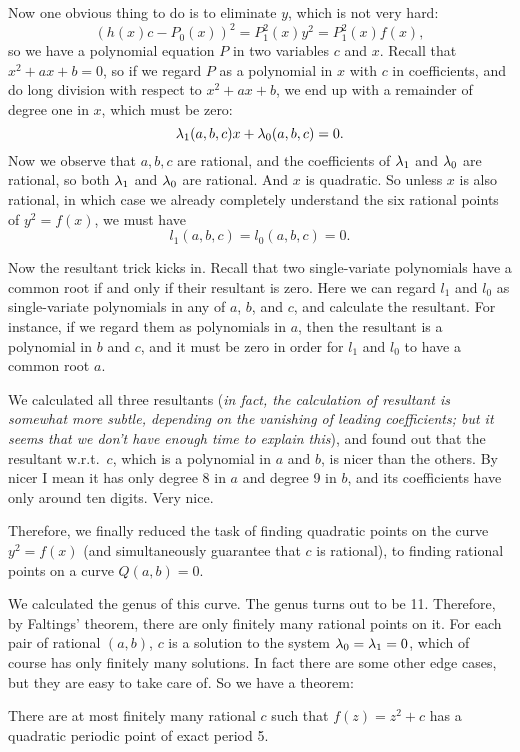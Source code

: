 Now one obvious thing to do is to eliminate $y$, which is not very
hard:
\[
(h(x) c - P_0(x))^2 = P_1^2(x) y^2 = P_1^2(x) f(x),
\]
so we have a polynomial equation $P$ in two variables $c$ and
$x$. Recall that $x^2 + ax + b = 0$, so if we regard $P$ as a
polynomial in $x$ with $c$ in coefficients, and do long division with
respect to $x^2 + ax + b$, we end up with a remainder of degree one in
$x$, which must be zero:
\[
\lambda_1(a, b, c) x + \lambda_0(a, b, c) = 0.
\]
Now we observe that $a, b, c$ are rational, and the coefficients of
$\lambda_1$ and $\lambda_0$ are rational, so both $\lambda_1$ and $\lambda_0$ are
rational. And $x$ is quadratic. So unless $x$ is also rational, in
which case we already completely understand the six rational points of
$y^2 = f(x)$, we must have
\[
l_1(a, b, c) = l_0(a, b, c) = 0.
\]

Now the resultant trick kicks in. Recall that two single-variate
polynomials have a common root if and only if their resultant is
zero. Here we can regard $l_1$ and $l_0$ as single-variate polynomials
in any of $a$, $b$, and $c$, and calculate the resultant. For
instance, if we regard them as polynomials in $a$, then the resultant
is a polynomial in $b$ and $c$, and it must be zero in order for $l_1$
and $l_0$ to have a common root $a$.

We calculated all three resultants (\textit{in fact, the calculation
  of resultant is somewhat more subtle, depending on the vanishing of
  leading coefficients; but it seems that we don't have enough time to
  explain this}), and found out that the resultant w.r.t.\ $c$, which
is a polynomial in $a$ and $b$, is nicer than the others. By nicer I
mean it has only degree 8 in $a$ and degree 9 in $b$, and its
coefficients have only around ten digits. Very nice.

Therefore, we finally reduced the task of finding quadratic points on
the curve $y^2 = f(x)$ (and simultaneously guarantee that $c$ is
rational), to finding rational points on a curve $Q(a, b) = 0$.

We calculated the genus of this curve. The genus turns out to be
11. Therefore, by Faltings' theorem, there are only finitely many
rational points on it. For each pair of rational $(a, b)$, $c$ is a
solution to the system $\lambda_0 = \lambda_1 = 0$, which of course has only
finitely many solutions. In fact there are some other edge cases, but
they are easy to take care of. So we have a theorem:

\begin{theorem}
  There are at most finitely many rational $c$ such that $f(z) = z^2 +
  c$ has a quadratic periodic point of exact period 5.
\end{theorem}

